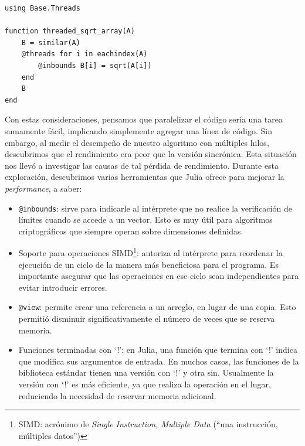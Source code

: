 \documentclass[11pt]{article}
\newcommand{\english}[1]{\textit{#1}}
\begin{document}
\begin{listing}[h]
\begin{verbatim}
using Base.Threads

function threaded_sqrt_array(A)
    B = similar(A)
    @threads for i in eachindex(A)
        @inbounds B[i] = sqrt(A[i])
    end
    B
end
\end{verbatim}
\caption{Ejemplo de utilización de las macros \lstinline{@threads} y \lstinline{@inbounds}}
\label{code:aes:julia_multithreading}
\end{listing}

Con estas consideraciones, pensamos que paralelizar el código sería una tarea sumamente fácil, implicando simplemente agregar una línea de código. Sin embargo, al medir el desempeño de nuestro algoritmo con múltiples hilos, descubrimos que el rendimiento era peor que la versión sincrónica. Esta situación nos llevó a investigar las causas de tal pérdida de rendimiento. Durante esta exploración, descubrimos varias herramientas que Julia ofrece para mejorar la \english{performance}, a saber:

\begin{itemize}
    \item \lstinline{@inbounds}: sirve para indicarle al intérprete que no realice la verificación de límites cuando se accede a un vector. Esto es muy útil para algoritmos criptográficos que siempre operan sobre dimensiones definidas.
    \item Soporte para operaciones SIMD\footnote{SIMD: acrónimo de \english{Single Instruction, Multiple Data} (``una instrucción, múltiples datos'')}: autoriza al intérprete para reordenar la ejecución de un ciclo de la manera más beneficiosa para el programa. Es importante asegurar que las operaciones en ese ciclo sean independientes para evitar introducir errores.
    \item \lstinline{@view}: permite crear una referencia a un arreglo, en lugar de una copia. Esto permitió disminuir significativamente el número de veces que se reserva memoria.
    \item Funciones terminadas con `!': en Julia, una función que termina con `!' indica que modifica sus argumentos de entrada. En muchos casos, las funciones de la biblioteca estándar tienen una versión con `!' y otra sin. Usualmente la versión con `!' es más eficiente, ya que realiza la operación en el lugar, reduciendo la necesidad de reservar memoria adicional.
\end{itemize}
\end{document}
